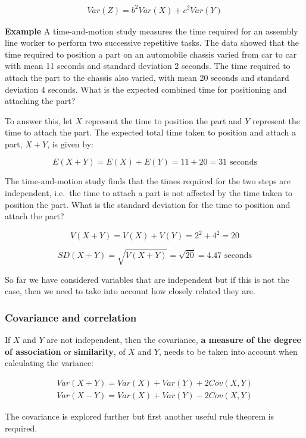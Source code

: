 \documentclass[
  oneside]{krantz}
\begin{document}
\begin{align}
Var(Z) = b^2Var(X) + c^2Var(Y)
\end{align}

\textbf{Example} A time-and-motion study measures the time required for an assembly line worker to perform two successive repetitive tasks. The data showed that the time required to position a part on an automobile chassis varied from car to car with mean 11 seconds and standard deviation 2 seconds. The time required to attach the part to the chassis also varied, with mean 20 seconds and standard deviation 4 seconds. What is the expected combined time for positioning and attaching the part?

To answer this, let \(X\) represent the time to position the part and \(Y\) represent the time to attach the part. The expected total time taken to position and attach a part, \(X+Y\), is given by:

\[ E(X+Y) = E(X) + E(Y) = 11 + 20 = 31 \textrm{ seconds}\]

The time-and-motion study finds that the times required for the two steps are independent, i.e.~the time to attach a part is not affected by the time taken to position the part. What is the standard deviation for the time to position and attach the part?

\[V(X+Y) = V(X) + V(Y) = 2^2 + 4^2 = 20 \]

\[SD(X+Y) = \sqrt{V(X+Y)} = \sqrt{20} = 4.47 \textrm{ seconds}\]

So far we have considered variables that are independent but if this is not the case, then we need to take into account how closely related they are.

\hypertarget{covariance-and-correlation}{%
\subsubsection{Covariance and correlation}\label{covariance-and-correlation}}

If \(X\) and \(Y\) are not independent, then the covariance, \textbf{a measure of the degree of association} or \textbf{similarity}, of \(X\) and \(Y\), needs to be taken into account when calculating the variance:

\begin{align}
Var(X+Y) = Var(X) + Var(Y) + 2Cov(X,Y) \\
Var(X-Y) = Var(X) + Var(Y) - 2Cov(X,Y)
\end{align}

The covariance is explored further but first another useful rule theorem is required.
\end{document}
